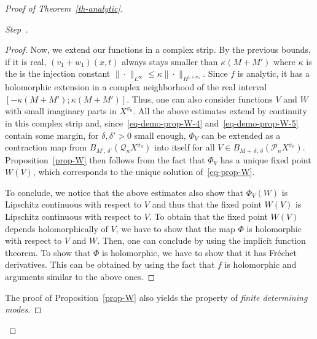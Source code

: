 \documentclass[AHL,Unicode,longabstracts]{cedram}
\newcommand{\Pc}{\mathcal{P}}
\newcommand{\Qc}{\mathcal{Q}}
\newcounter{stepcount}
\newenvironment{step}{\refstepcounter{stepcount}\begin{proof}[Step~\thestepcount]}{\let\qed\relax\end{proof}}
\begin{document}
\begin{proof}[{Proof of Theorem~\ref{th-analytic}}]
\begin{step}
\begin{proof}
Now, we extend our functions in a complex strip. By the previous bounds, if it is real, $(v_1+w_1)(x,t)$ always stays smaller than $\kappa(M+M')$ where $\kappa$ is the is the injection constant $\|\cdot\|_{L^\infty}\leq \kappa
\|\cdot\|_{H^{1+\sigma_0}}$. Since $f$ is analytic, it has a holomorphic extension in a complex neighborhood of the real interval $[-\kappa(M+M');\kappa(M+M')]$. Thus, one can also consider functions $V$ and $W$ with small imaginary parts in $X^{\sigma_0}$. All the above estimates extend by continuity in this complex strip and, since~\eqref{eq-demo-prop-W-4} and~\eqref{eq-demo-prop-W-5} contain some margin, for $\delta,\delta'>0$ small enough, $\Phi_V$ can be extended as a contraction map from $B_{M',\,\delta'}(\Qc_nX^{\sigma_0})$ into itself for all $V\in B_{M+\,\delta,\,\delta}(\Pc_nX^{\sigma_0})$. Proposition~\ref{prop-W} then follows from the fact that $\Phi_V$ has a unique fixed point $W(V)$, which corresponds to the unique solution of~\eqref{eq-prop-W}.

To conclude, we notice that the above estimates also show that $\Phi_V(W)$ is Lipschitz continuous with respect to $V$ and thus that the fixed point $W(V)$ is Lipschitz continuous with respect to $V$. To obtain that the fixed point $W(V)$ depends holomorphically of $V$, we have to show that the map $\Phi$ is holomorphic with respect to $V$ and $W$. Then, one can conclude by using the implicit function theorem. To show that $\Phi$ is holomorphic, we have to show that it has Fréchet derivatives. This can be obtained by using the fact that $f$ is holomorphic and arguments similar to the above ones.
\end{proof}


The proof of Proposition~\ref{prop-W} also yields the property of \emph{finite determining modes}.


\end{step}
\end{proof}
\end{document}
